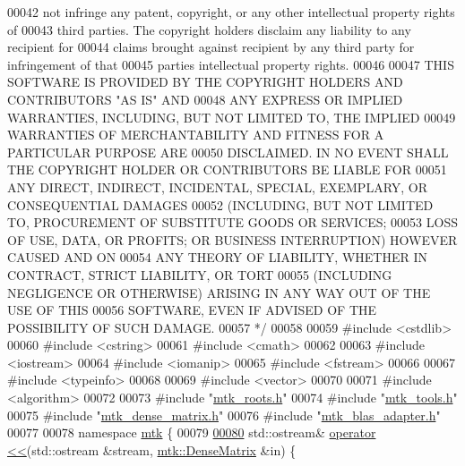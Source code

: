 \begin{DoxyCode}
00042 \textcolor{comment}{not infringe any patent, copyright, or any other intellectual property rights of}
00043 \textcolor{comment}{third parties. The copyright holders disclaim any liability to any recipient for}
00044 \textcolor{comment}{claims brought against recipient by any third party for infringement of that}
00045 \textcolor{comment}{parties intellectual property rights.}
00046 \textcolor{comment}{}
00047 \textcolor{comment}{THIS SOFTWARE IS PROVIDED BY THE COPYRIGHT HOLDERS AND CONTRIBUTORS "AS IS" AND}
00048 \textcolor{comment}{ANY EXPRESS OR IMPLIED WARRANTIES, INCLUDING, BUT NOT LIMITED TO, THE IMPLIED}
00049 \textcolor{comment}{WARRANTIES OF MERCHANTABILITY AND FITNESS FOR A PARTICULAR PURPOSE ARE}
00050 \textcolor{comment}{DISCLAIMED. IN NO EVENT SHALL THE COPYRIGHT HOLDER OR CONTRIBUTORS BE LIABLE FOR}
00051 \textcolor{comment}{ANY DIRECT, INDIRECT, INCIDENTAL, SPECIAL, EXEMPLARY, OR CONSEQUENTIAL DAMAGES}
00052 \textcolor{comment}{(INCLUDING, BUT NOT LIMITED TO, PROCUREMENT OF SUBSTITUTE GOODS OR SERVICES;}
00053 \textcolor{comment}{LOSS OF USE, DATA, OR PROFITS; OR BUSINESS INTERRUPTION) HOWEVER CAUSED AND ON}
00054 \textcolor{comment}{ANY THEORY OF LIABILITY, WHETHER IN CONTRACT, STRICT LIABILITY, OR TORT}
00055 \textcolor{comment}{(INCLUDING NEGLIGENCE OR OTHERWISE) ARISING IN ANY WAY OUT OF THE USE OF THIS}
00056 \textcolor{comment}{SOFTWARE, EVEN IF ADVISED OF THE POSSIBILITY OF SUCH DAMAGE.}
00057 \textcolor{comment}{*/}
00058 
00059 \textcolor{preprocessor}{#include <cstdlib>}
00060 \textcolor{preprocessor}{#include <cstring>}
00061 \textcolor{preprocessor}{#include <cmath>}
00062 
00063 \textcolor{preprocessor}{#include <iostream>}
00064 \textcolor{preprocessor}{#include <iomanip>}
00065 \textcolor{preprocessor}{#include <fstream>}
00066 
00067 \textcolor{preprocessor}{#include <typeinfo>}
00068 
00069 \textcolor{preprocessor}{#include <vector>}
00070 
00071 \textcolor{preprocessor}{#include <algorithm>}
00072 
00073 \textcolor{preprocessor}{#include "\hyperlink{mtk__roots_8h}{mtk\_roots.h}"}
00074 \textcolor{preprocessor}{#include "\hyperlink{mtk__tools_8h}{mtk\_tools.h}"}
00075 \textcolor{preprocessor}{#include "\hyperlink{mtk__dense__matrix_8h}{mtk\_dense\_matrix.h}"}
00076 \textcolor{preprocessor}{#include "\hyperlink{mtk__blas__adapter_8h}{mtk\_blas\_adapter.h}"}
00077 
00078 \textcolor{keyword}{namespace }\hyperlink{namespacemtk}{mtk} \{
00079 
\hypertarget{mtk__dense__matrix_8cc_source_l00080}{}\hyperlink{namespacemtk_ad3bcf52cda59ddb5fc7b4bdce76c46dc}{00080} std::ostream& \hyperlink{namespacemtk_ad3bcf52cda59ddb5fc7b4bdce76c46dc}{operator <<}(std::ostream &stream, \hyperlink{classmtk_1_1DenseMatrix}{mtk::DenseMatrix} &in) \{

\end{DoxyCode}
